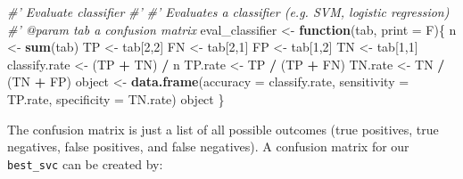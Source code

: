 \documentclass[]{book}
\newenvironment{Shaded}{\begin{snugshade}}{\end{snugshade}}
\newcommand{\CommentTok}[1]{\textcolor[rgb]{0.56,0.35,0.01}{\textit{#1}}}
\newcommand{\ControlFlowTok}[1]{\textcolor[rgb]{0.13,0.29,0.53}{\textbf{#1}}}
\newcommand{\DataTypeTok}[1]{\textcolor[rgb]{0.13,0.29,0.53}{#1}}
\newcommand{\DecValTok}[1]{\textcolor[rgb]{0.00,0.00,0.81}{#1}}
\newcommand{\KeywordTok}[1]{\textcolor[rgb]{0.13,0.29,0.53}{\textbf{#1}}}
\newcommand{\NormalTok}[1]{#1}
\newcommand{\OperatorTok}[1]{\textcolor[rgb]{0.81,0.36,0.00}{\textbf{#1}}}
\newcommand{\StringTok}[1]{\textcolor[rgb]{0.31,0.60,0.02}{#1}}
\begin{document}
\begin{Shaded}
\begin{Highlighting}[]
\CommentTok{#' Evaluate classifier}
\CommentTok{#'}
\CommentTok{#' Evaluates a classifier (e.g. SVM, logistic regression)}
\CommentTok{#' @param tab a confusion matrix}
\NormalTok{eval_classifier <-}\StringTok{ }\ControlFlowTok{function}\NormalTok{(tab, }\DataTypeTok{print =}\NormalTok{ F)\{}
\NormalTok{  n <-}\StringTok{ }\KeywordTok{sum}\NormalTok{(tab)}
\NormalTok{  TP <-}\StringTok{ }\NormalTok{tab[}\DecValTok{2}\NormalTok{,}\DecValTok{2}\NormalTok{]}
\NormalTok{  FN <-}\StringTok{ }\NormalTok{tab[}\DecValTok{2}\NormalTok{,}\DecValTok{1}\NormalTok{]}
\NormalTok{  FP <-}\StringTok{ }\NormalTok{tab[}\DecValTok{1}\NormalTok{,}\DecValTok{2}\NormalTok{]}
\NormalTok{  TN <-}\StringTok{ }\NormalTok{tab[}\DecValTok{1}\NormalTok{,}\DecValTok{1}\NormalTok{]}
\NormalTok{  classify.rate <-}\StringTok{ }\NormalTok{(TP }\OperatorTok{+}\StringTok{ }\NormalTok{TN) }\OperatorTok{/}\StringTok{ }\NormalTok{n}
\NormalTok{  TP.rate <-}\StringTok{ }\NormalTok{TP }\OperatorTok{/}\StringTok{ }\NormalTok{(TP }\OperatorTok{+}\StringTok{ }\NormalTok{FN)}
\NormalTok{  TN.rate <-}\StringTok{ }\NormalTok{TN }\OperatorTok{/}\StringTok{ }\NormalTok{(TN }\OperatorTok{+}\StringTok{ }\NormalTok{FP)}
\NormalTok{  object <-}\StringTok{ }\KeywordTok{data.frame}\NormalTok{(}\DataTypeTok{accuracy =}\NormalTok{ classify.rate,}
                       \DataTypeTok{sensitivity =}\NormalTok{ TP.rate,}
                       \DataTypeTok{specificity =}\NormalTok{ TN.rate)}
\NormalTok{  object}
\NormalTok{\}}
\end{Highlighting}
\end{Shaded}

The confusion matrix is just a list of all possible outcomes (true positives, true negatives, false positives, and false negatives). A confusion matrix for our \texttt{best\_svc} can be created by:

\begin{Shaded}
\end{Shaded}
\end{document}
